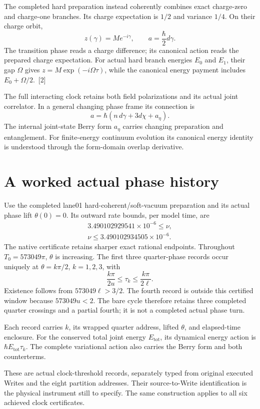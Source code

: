 \documentclass[10pt,twocolumn,letterpaper]{article}
\begin{document}
The completed hard preparation instead coherently combines exact charge-zero and charge-one branches. Its charge expectation is $1/2$ and variance $1/4$. On their charge orbit,
\[
z(\gamma)=Me^{-i\gamma},\qquad a=\frac{\hbar}{2}d\gamma.
\]
The transition phase reads a charge difference; its canonical action reads the prepared charge expectation. For actual hard branch energies $E_0$ and $E_1$, their gap $\Omega$ gives $z=M\exp(-i\Omega\tau)$, while the canonical energy payment includes $E_0+\Omega/2$.~[2]

The full interacting clock retains both field polarizations and its actual joint correlator. In a general changing phase frame its connection is
\[
a=\hbar(n\,d\gamma+3d\chi+a_\eta).
\]
The internal joint-state Berry form $a_\eta$ carries changing preparation and entanglement. For finite-energy continuum evolution its canonical energy identity is understood through the form-domain overlap derivative.

\section{A worked actual phase history}
Use the completed lane01 hard-coherent/soft-vacuum preparation and its actual phase lift $\theta(0)=0$. Its outward rate bounds, per model time, are
\[
\begin{gathered}
3.490102929541\times10^{-6}\leq\nu,\\
\nu\leq3.490102934505\times10^{-6}.
\end{gathered}
\]
The native certificate retains sharper exact rational endpoints. Throughout $T_0=573049\pi$, $\theta$ is increasing. The first three quarter-phase records occur uniquely at $\theta=k\pi/2$, $k=1,2,3$, with
\[
\frac{k\pi}{2u}\leq\tau_k\leq\frac{k\pi}{2\ell}.
\]
Existence follows from $573049\ell>3/2$. The fourth record is outside this certified window because $573049u<2$. The bare cycle therefore retains three completed quarter crossings and a partial fourth; it is not a completed actual phase turn.

Each record carries $k$, its wrapped quarter address, lifted $\theta$, and elapsed-time enclosure. For the conserved total joint energy $E_{\mathrm{tot}}$, its dynamical energy action is $\hbar E_{\mathrm{tot}}\tau_k$. The complete variational action also carries the Berry form and both counterterms.

These are actual clock-threshold records, separately typed from original executed Writes and the eight partition addresses. Their source-to-Write identification is the physical instrument still to specify. The same construction applies to all six achieved clock certificates.
\end{document}
